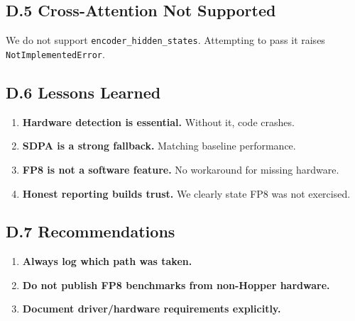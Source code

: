 \subsection{D.5 Cross-Attention Not Supported}

We do not support \texttt{encoder\_hidden\_states}. Attempting to pass it raises 
\texttt{NotImplementedError}.

\subsection{D.6 Lessons Learned}

\begin{enumerate}
\item \textbf{Hardware detection is essential.} Without it, code crashes.
\item \textbf{SDPA is a strong fallback.} Matching baseline performance.
\item \textbf{FP8 is not a software feature.} No workaround for missing hardware.
\item \textbf{Honest reporting builds trust.} We clearly state FP8 was not exercised.

\end{enumerate}
\subsection{D.7 Recommendations}

\begin{enumerate}
\item \textbf{Always log which path was taken.}
\item \textbf{Do not publish FP8 benchmarks from non-Hopper hardware.}
\item \textbf{Document driver/hardware requirements explicitly.}

\end{enumerate}
